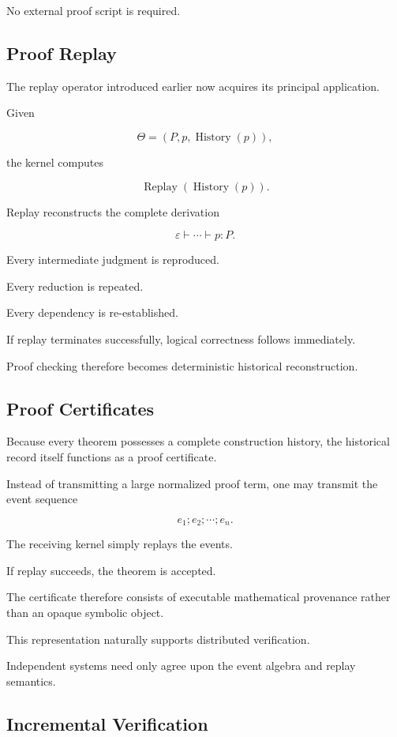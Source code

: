 \documentclass[12pt,oneside]{article}
\theoremstyle{definition}
\theoremstyle{remark}
\DeclareMathOperator{\History}{History}
\DeclareMathOperator{\Replay}{Replay}
\begin{document}
No external proof script is required.

\subsection{Proof Replay}

The replay operator introduced earlier now acquires its principal application.

Given

\[
\Theta
=
(P,p,\History(p)),
\]

the kernel computes

\[
\Replay(\History(p)).
\]

Replay reconstructs the complete derivation

\[
\varepsilon
\vdash
\cdots
\vdash
p:P.
\]

Every intermediate judgment is reproduced.

Every reduction is repeated.

Every dependency is re-established.

If replay terminates successfully, logical correctness follows immediately.

Proof checking therefore becomes deterministic historical reconstruction.

\subsection{Proof Certificates}

Because every theorem possesses a complete construction history, the historical
record itself functions as a proof certificate.

Instead of transmitting a large normalized proof term, one may transmit the
event sequence

\[
e_1;
e_2;
\cdots;
e_n.
\]

The receiving kernel simply replays the events.

If replay succeeds, the theorem is accepted.

The certificate therefore consists of executable mathematical provenance rather
than an opaque symbolic object.

This representation naturally supports distributed verification.

Independent systems need only agree upon the event algebra and replay semantics.

\subsection{Incremental Verification}
\end{document}
